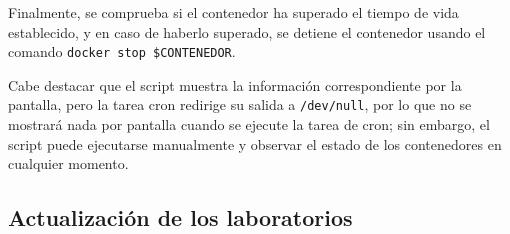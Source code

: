                 Finalmente, se comprueba si el contenedor ha superado el tiempo de vida establecido, y en caso de haberlo superado, se detiene el contenedor usando el comando \texttt{docker stop \$CONTENEDOR}.

                Cabe destacar que el script muestra la información correspondiente por la pantalla, pero la tarea cron redirige su salida a \texttt{/dev/null}, por lo que no se mostrará nada por pantalla cuando se ejecute la tarea de cron; sin embargo, el script puede ejecutarse manualmente y observar el estado de los contenedores en cualquier momento.

                \newpage

        \subsection{Actualización de los laboratorios}
        
